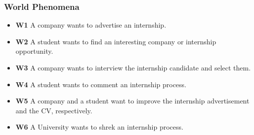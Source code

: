 \documentclass{article}
\begin{document}
\subsubsection{World Phenomena}
    \begin{itemize}
        \item \textbf{W1} A company wants to advertise an internship. 
        \item \textbf{W2} A student wants to find an interesting company or internship opportunity.
        \item \textbf{W3} A company wants to interview the internship candidate and select them.
        \item \textbf{W4} A student wants to comment an internship process.    
        \item \textbf{W5} A company and a student want to improve the internship advertisement and the CV, respectively.
        \item \textbf{W6} A University wants to shrek an internship process.
    \end{itemize}
\end{document}
